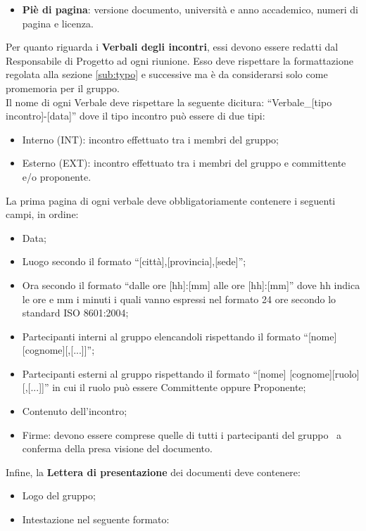 {{\begin{itemize}
			\item \textbf{Pi\`{e} di pagina}: versione documento, universit\`{a} e anno accademico, numeri di pagina e licenza.
		\end{itemize}
		Per quanto riguarda i \textbf{Verbali degli incontri}, essi devono essere redatti dal Responsabile di Progetto ad ogni riunione. Esso deve rispettare la formattazione regolata alla sezione \ref{sub:typo} e successive ma \`{e} da considerarsi solo come promemoria per il gruppo.\\
		Il nome di ogni Verbale deve rispettare la seguente dicitura: “Verbale\_[tipo incontro]-[data]” dove il tipo incontro pu\`{o} essere di due tipi:
		\begin{itemize}
			\item Interno (INT): incontro effettuato tra i membri del gruppo;
			\item Esterno (EXT): incontro effettuato tra i membri del gruppo e committente e/o proponente.
		\end{itemize}
		La prima pagina di ogni verbale deve obbligatoriamente contenere i seguenti campi, in ordine:
		\begin{itemize}
			\item Data;
			\item Luogo secondo il formato “[citt\`{a}],[provincia],[sede]”;
			\item Ora secondo il formato “dalle ore [hh]:[mm] alle ore [hh]:[mm]” dove hh indica le ore e mm i minuti i quali vanno espressi nel formato 24 ore secondo lo standard ISO 8601:2004;
			\item Partecipanti interni al gruppo elencandoli rispettando il formato “[nome] [cognome][,[...]]”;
			\item Partecipanti esterni al gruppo rispettando il formato “[nome] [cognome][ruolo][,[...]]” in cui il ruolo pu\`{o} essere Committente oppure Proponente;
			\item Contenuto dell'incontro;
			\item Firme: devono essere comprese quelle di tutti i partecipanti del gruppo \gruppo\ a conferma della presa visione del documento.
		\end{itemize}
		Infine, la \textbf{Lettera di presentazione} dei documenti deve contenere:
		\begin{itemize}
			\item Logo del gruppo;
			\item Intestazione nel seguente formato:\\

\end{itemize}}}
